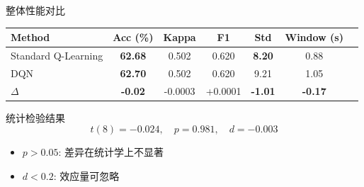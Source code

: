 \begin{frame}{整体性能对比}
    \begin{table}[h]
        \centering
        \begin{tabular}{lcccccc}
            \hline
            \textbf{Method} & \textbf{Acc (\%)} & \textbf{Kappa} & \textbf{F1} & \textbf{Std} & \textbf{Window (s)} \\
            \hline
            Standard Q-Learning & \textbf{62.68} & 0.502 & 0.620 & \textbf{8.20} & 0.88 \\
            DQN & \textbf{62.70} & 0.502 & 0.620 & 9.21 & 1.05 \\
            \hline
            $\Delta$ & \textbf{-0.02} & -0.0003 & +0.0001 & \textbf{-1.01} & \textbf{-0.17} \\
            \hline
        \end{tabular}
    \end{table}
    
    \vspace{0.3cm}
    \begin{alertblock}{统计检验结果}
        \[
        t(8) = -0.024, \quad p = 0.981, \quad d = -0.003
        \]
        \begin{itemize}
            \item $p > 0.05$: 差异在统计学上不显著
            \item $d < 0.2$: 效应量可忽略
        \end{itemize}
    \end{alertblock}
\end{frame}


